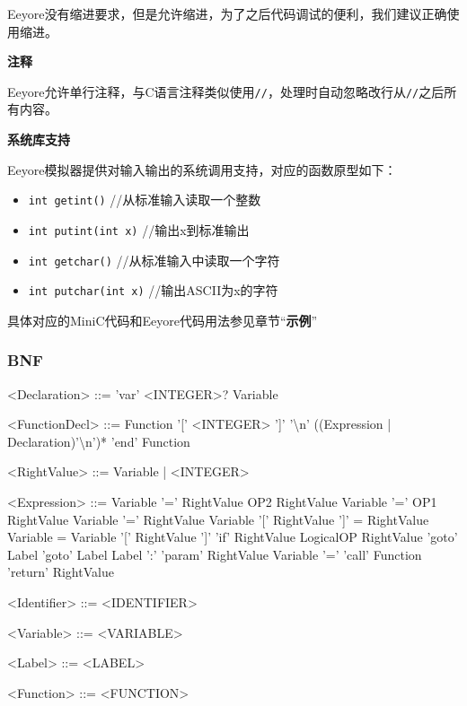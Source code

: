 Eeyore没有缩进要求，但是允许缩进，为了之后代码调试的便利，我们建议正确使用缩进。

\noindent \textbf{注释}

Eeyore允许单行注释，与C语言注释类似使用\texttt{//}，处理时自动忽略改行从\texttt{//}之后所有内容。

\noindent \textbf{系统库支持}

Eeyore模拟器提供对输入输出的系统调用支持，对应的函数原型如下：
\begin{itemize}
	\item \texttt{int getint()} //从标准输入读取一个整数
	\item \texttt{int putint(int x)} //输出x到标准输出
	\item \texttt{int getchar()} //从标准输入中读取一个字符
	\item \texttt{int putchar(int x)} //输出ASCII为x的字符
\end{itemize}
具体对应的MiniC代码和Eeyore代码用法参见章节“\textbf{示例}”
\newpage
\subsubsection{BNF}
\begin{typewriterfont}
\setlength{\grammarindent}{8em} %
\begin{grammar}
<Declaration> ::= 'var' <INTEGER>? Variable

<FunctionDecl> ::= Function '[' <INTEGER> ']' '\textbackslash n' ((Expression | Declaration)'\textbackslash n')* 'end' Function

<RightValue> ::= Variable | <INTEGER>

<Expression>	::=	Variable '=' RightValue OP2 RightValue
\alt Variable '=' OP1 RightValue
\alt Variable '=' RightValue
\alt Variable '[' RightValue ']' = RightValue
\alt Variable = Variable '[' RightValue ']'
\alt 'if' RightValue LogicalOP RightValue 'goto' Label
\alt 'goto' Label
\alt Label ':'
\alt 'param' RightValue
\alt Variable '=' 'call' Function
\alt 'return' RightValue


<Identifier>	::=	<IDENTIFIER>

<Variable> ::= <VARIABLE>

<Label> ::= <LABEL>

<Function> ::= <FUNCTION>

\end{grammar}
\end{typewriterfont}
\newpage
